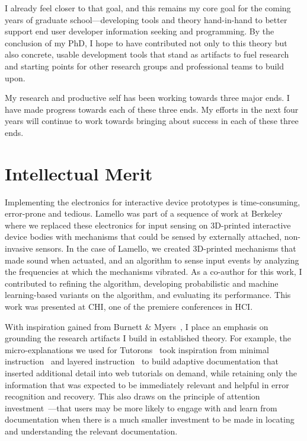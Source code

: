 \documentclass[12pt]{memoir}
\begin{document}
I already feel closer to that goal, and this remains my core goal for the coming years of graduate school---developing tools and theory hand-in-hand to better support end user developer information seeking and programming.
By the conclusion of my PhD, I hope to have contributed not only to this theory but also concrete, usable development tools that stand as artifacts to fuel research and starting points for other research groups and professional teams to build upon.

My research and productive self has been working towards three major ends.
I have made progress towards each of these three ends.
My efforts in the next four years will continue to work towards bringing about success in each of these three ends.
\fi

\section{Intellectual Merit}

Implementing the electronics for interactive device prototypes is time-consuming, error-prone and tedious.
Lamello was part of a sequence of work at Berkeley where we replaced these electronics for input sensing on 3D-printed interactive device bodies with mechanisms that could be sensed by externally attached, non-invasive sensors.
In the case of Lamello, we created 3D-printed mechanisms that made sound when actuated, and an algorithm to sense input events by analyzing the frequencies at which the mechanisms vibrated.
As a co-author for this work, I contributed to refining the algorithm, developing probabilistic and machine learning-based variants on the algorithm, and evaluating its performance.
This work was presented at CHI, one of the premiere conferences in HCI\@.

With inspiration gained from Burnett \& Myers~\cite{burnett_future_2014}, I place an emphasis on grounding the research artifacts I build in established theory.
For example, the micro-explanations we used for Tutorons~\cite{head_tutorons_2015} took inspiration from minimal instruction~\cite{carroll_nurnberg_1990} and layered instruction~\cite{farkas_layering_1998} to build adaptive documentation that inserted additional detail into web tutorials on demand, while retaining only the information that was expected to be immediately relevant and helpful in error recognition and recovery.
This also draws on the principle of attention investment~\cite{blackwell_psychological_2006}---that users may be more likely to engage with and learn from documentation when there is a much smaller investment to be made in locating and understanding the relevant documentation.
\end{document}
